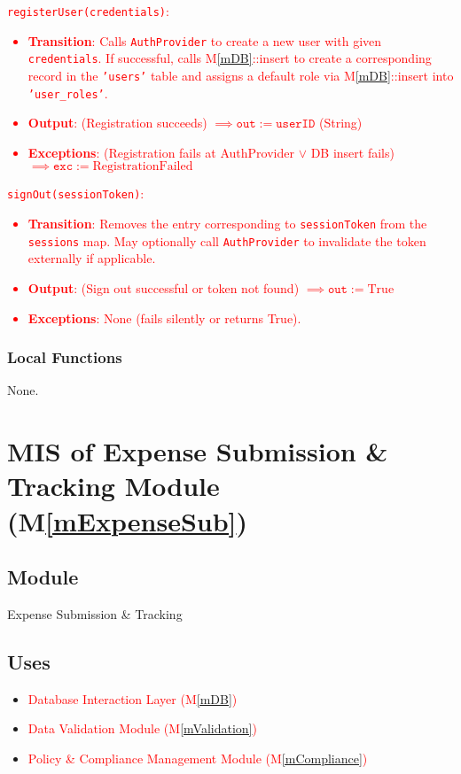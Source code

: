 \documentclass[12pt, titlepage]{article}
\providecommand{\mref}[1]{M\ref{#1}}
\begin{document}
\textcolor{red}{
\noindent \texttt{registerUser(credentials)}:
\begin{itemize}
    \item \textbf{Transition}: Calls \texttt{AuthProvider} to create a new user with given \texttt{credentials}. If successful, calls \mref{mDB}::insert to create a corresponding record in the \texttt{'users'} table and assigns a default role via \mref{mDB}::insert into \texttt{'user\_roles'}.
    \item \textbf{Output}: (Registration succeeds) $\implies \texttt{out} := \texttt{userID}$ (String)
    \item \textbf{Exceptions}: (Registration fails at AuthProvider $\lor$ DB insert fails) $\implies \texttt{exc} := \text{RegistrationFailed}$
\end{itemize}
} %

\textcolor{red}{
\noindent \texttt{signOut(sessionToken)}:
\begin{itemize}
    \item \textbf{Transition}: Removes the entry corresponding to \texttt{sessionToken} from the \texttt{sessions} map. May optionally call \texttt{AuthProvider} to invalidate the token externally if applicable.
    \item \textbf{Output}: (Sign out successful or token not found) $\implies \texttt{out} := \text{True}$
    \item \textbf{Exceptions}: None (fails silently or returns True).
\end{itemize}
} %

\subsubsection{Local Functions}
None.

\section{MIS of Expense Submission \& Tracking Module (\mref{mExpenseSub})}
\subsection{Module}
Expense Submission \& Tracking

\subsection{Uses}
\begin{itemize}
    \item \textcolor{red}{Database Interaction Layer (\mref{mDB})}
    \item \textcolor{red}{Data Validation Module (\mref{mValidation})}
    \item \textcolor{red}{Policy \& Compliance Management Module (\mref{mCompliance})} %
\end{itemize}
\end{document}
